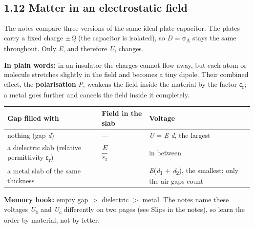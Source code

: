 \documentclass[11pt]{article}
\begin{document}
\begin{keepsection}
\section{1.12 Matter in an electrostatic field}

The notes compare three versions of the same ideal plate capacitor. The plates carry a fixed charge \ensuremath{\pm}\textit{Q} (the capacitor is isolated), so \textit{D} = σ\textsubscript{A} stays the same throughout. Only \textit{E}, and therefore \textit{U}, changes.

\begin{plainbox}\textbf{In plain words:} in an insulator the charges cannot flow away, but each atom or molecule stretches slightly in the field and becomes a tiny dipole. Their combined effect, the \textbf{polarisation} \textit{P}, weakens the field inside the material by the factor ε\textsubscript{r}; a metal goes further and cancels the field inside it completely.\end{plainbox}

\begin{center}\small\begin{tabularx}{\linewidth}{>{\raggedright\arraybackslash}X>{\raggedright\arraybackslash}X>{\raggedright\arraybackslash}X}\toprule
\textbf{Gap filled with} & \textbf{Field in the slab} & \textbf{Voltage} \\ \midrule
nothing (gap \textit{d}) & — & \textit{U} = \textit{E d}, the largest \\
a dielectric slab (relative permittivity ε\textsubscript{r}) & {\small\ensuremath{\dfrac{{E}}{ε_{\mathrm{r}}}}} & in between \\
a metal slab of the same thickness & 0 & \textit{E}(\textit{d}\textsubscript{1} + \textit{d}\textsubscript{2}), the smallest; only the air gaps count \\
\bottomrule\end{tabularx}\end{center}

\begin{notebox}\textbf{Memory hook:} empty gap \ensuremath{>} dielectric \ensuremath{>} metal. The notes name these voltages \textit{U}\textsubscript{b} and \textit{U}\textsubscript{c} differently on two pages (see Slips in the notes), so learn the order by material, not by letter.\end{notebox}


\end{keepsection}
\end{document}
